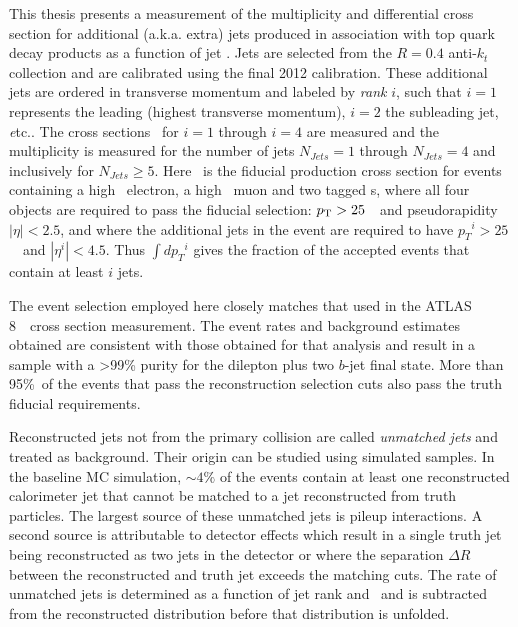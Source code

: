 This thesis presents a measurement of the multiplicity and differential 
cross section for additional (a.k.a. extra) jets produced in 
association with top quark decay products as a function of jet \pT.  Jets are selected from the  $R=0.4$ anti-$k_t$
collection and are calibrated using the final 2012 calibration. These additional jets are ordered 
in transverse momentum and labeled by \textit{rank} $i$, such that $i=1$ represents 
the leading (highest transverse momentum),  $i=2$ the subleading jet, {\textit etc.}.  The cross sections
\sigmapti\ for $i=1$ through $i=4$ are measured and 
the multiplicity is measured for the number of jets $N_{Jets}=1$ through $N_{Jets}=4$ 
and inclusively for  $N_{Jets}\ge 5$.  Here \sigemubb\ is the fiducial production cross section 
for  events containing a high \pT\ electron, a high \pT\ muon and two tagged \bjet s,
where all four objects are required to pass the fiducial selection:  $p_{\text{T}}>25$~\GeV\ and pseudorapidity $|\eta|<2.5$,
and where the  additional jets in the event are required to have
${p_T}^{i}>25$~\GeV\ and $|\eta^{i}|<4.5$. Thus  $\int$\sigmapti $d{p_T}^{i}$ gives
the fraction of the accepted events that contain at least $i$ jets.

The event selection employed here closely matches that used in the ATLAS 8~\TeV\ cross
section measurement\cite{xsec}. The event rates and background estimates obtained 
are consistent with those obtained for that analysis and result in a sample with a >99\% purity
for the dilepton plus two $b$-jet final state. More than 95\%\ of
the events that pass the reconstruction selection cuts also pass the truth fiducial requirements.


Reconstructed jets not from the primary collision are called \textit{unmatched jets} and treated as
background.  Their origin can be studied using simulated samples. In the baseline MC simulation, $\sim 4\%$ of the events 
contain at least one reconstructed calorimeter
jet that cannot be matched to a jet reconstructed from truth particles.  The largest
source of these unmatched jets is pileup interactions.  A second
source is attributable to  detector effects which result in a single truth jet being reconstructed as
two jets in the detector or where  the separation  $\Delta R$ between the reconstructed and truth jet
exceeds the matching cuts.  The rate of unmatched jets is determined as a function of
jet rank and  \pT\ and  is subtracted from the reconstructed distribution before that distribution is
unfolded.

